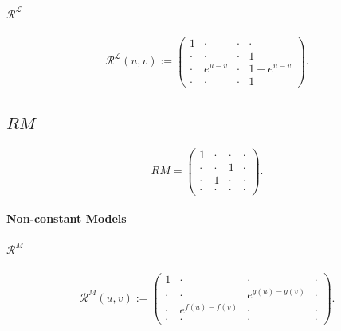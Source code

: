 \documentclass{article}
\begin{document}
\paragraph{$\mathcal{R^L}$}
  \begin{equation}
  \label{RL}
   \mathcal{R^L}(u,v):= \begin{pmatrix}
        1&\cdot&\cdot&\cdot\\
        \cdot&\cdot&\cdot&1\\
        \cdot&e^{u-v}&\cdot&1-e^{u-v}\\
        \cdot&\cdot&\cdot&1
    \end{pmatrix}.
    \end{equation}
    
\subsection{$RM$}
\label{sec:RM}
 \begin{equation}
     RM= \begin{pmatrix}
        1&\cdot&\cdot&\cdot\\
        \cdot&\cdot &1&\cdot\\
        \cdot&1&\cdot &\cdot\\
        \cdot&\cdot&\cdot&\cdot
    \end{pmatrix}.
\end{equation}

\paragraph{\textcolor{TealBlue}{Non-constant Models}}
\begin{center}
\end{center}

\paragraph{$\mathcal{R}^M$}
    \begin{equation}
    \label{RM}
   \mathcal{R}^M(u,v):= \begin{pmatrix}
        1&\cdot&\cdot&\cdot\\
        \cdot&\cdot&e^{g(u)-g(v)}&\cdot\\
        \cdot&e^{f(u)-f(v)}&\cdot&\cdot\\
        \cdot&\cdot&\cdot&\cdot
    \end{pmatrix}.
    \end{equation}
\end{document}
